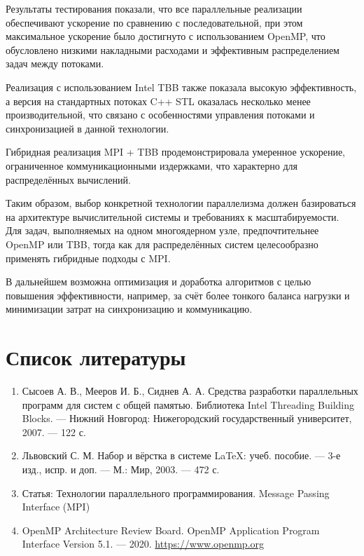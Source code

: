 \documentclass[a4paper,14pt]{article}
\begin{document}
Результаты тестирования показали, что все параллельные реализации обеспечивают ускорение по сравнению с последовательной, при этом максимальное ускорение было достигнуто с использованием OpenMP, что обусловлено низкими накладными расходами и эффективным распределением задач между потоками.

Реализация с использованием Intel TBB также показала высокую эффективность, а версия на стандартных потоках C++ STL оказалась несколько менее производительной, что связано с особенностями управления потоками и синхронизацией в данной технологии.

Гибридная реализация MPI + TBB продемонстрировала умеренное ускорение, ограниченное коммуникационными издержками, что характерно для распределённых вычислений.

Таким образом, выбор конкретной технологии параллелизма должен базироваться на архитектуре вычислительной системы и требованиях к масштабируемости. Для задач, выполняемых на одном многоядерном узле, предпочтительнее OpenMP или TBB, тогда как для распределённых систем целесообразно применять гибридные подходы с MPI.

В дальнейшем возможна оптимизация и доработка алгоритмов с целью повышения эффективности, например, за счёт более тонкого баланса нагрузки и минимизации затрат на синхронизацию и коммуникацию.

\newpage
\section{Список литературы}
\begin{enumerate}
    \item Сысоев А. В., Мееров И. Б., Сиднев А. А. Средства разработки параллельных программ для систем с общей памятью. Библиотека Intel Threading Building Blocks. — Нижний Новгород: Нижегородский государственный университет, 2007. — 122 с.
    \item Львовский С. М. Набор и вёрстка в системе LaTeX: учеб. пособие. — 3-е изд., испр. и доп. — М.: Мир, 2003. — 472 с.
    \item Статья: Технологии параллельного программирования. Message Passing Interface (MPI)
    \item OpenMP Architecture Review Board. OpenMP Application Program Interface Version 5.1. — 2020. \url{https://www.openmp.org}
\end{enumerate}
\end{document}
